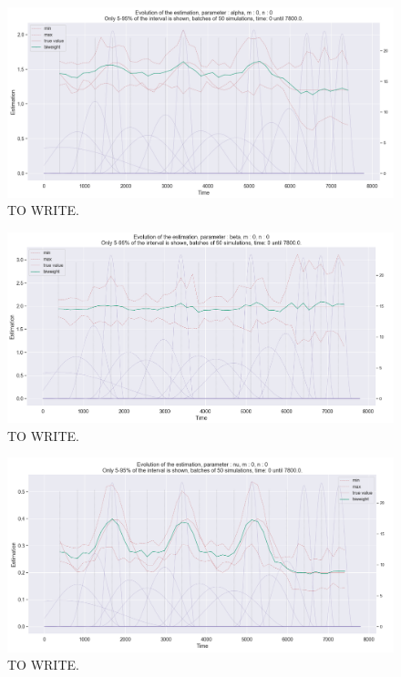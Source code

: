 \begin{figure}
\centering
\includegraphics[width = 0.90 \textwidth]{../imag/chap3/4/Figure_10.png}
\caption{TO WRITE.}
\label{fig:second_estimate_4_alpha}
\end{figure}

\begin{figure}
\centering
\includegraphics[width = 0.90 \textwidth]{../imag/chap3/4/Figure_11.png}
\caption{TO WRITE.}
\label{fig:second_estimate_4_beta}
\end{figure}

\begin{figure}
\centering
\includegraphics[width = 0.90 \textwidth]{../imag/chap3/4/Figure_12.png}
\caption{TO WRITE.}
\label{fig:second_estimate_4_nu}
\end{figure}










